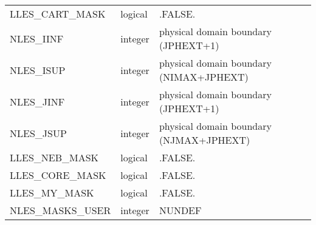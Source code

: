 \begin{center}
\begin{tabular} {|l|l|l|}
LLES\_CART\_MASK              & logical           & .FALSE. \\
NLES\_IINF                    & integer           & physical domain boundary (JPHEXT+1) \\
NLES\_ISUP                    & integer           & physical domain boundary (NIMAX+JPHEXT) \\
NLES\_JINF                    & integer           & physical domain boundary (JPHEXT+1) \\
NLES\_JSUP                    & integer           & physical domain boundary (NJMAX+JPHEXT) \\
LLES\_NEB\_MASK               & logical           & .FALSE. \\
LLES\_CORE\_MASK              & logical           & .FALSE. \\
LLES\_MY\_MASK                & logical           & .FALSE. \\
NLES\_MASKS\_USER             & integer           & NUNDEF \\
\hline
\end{tabular}
\end{center}


